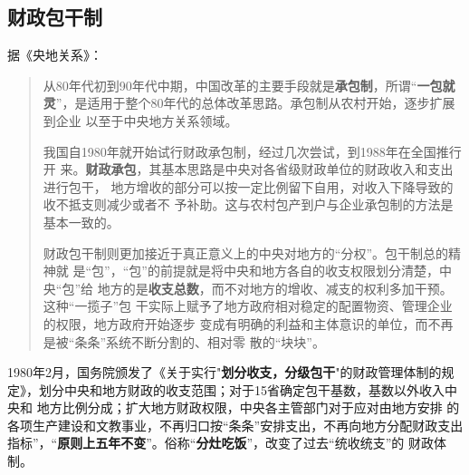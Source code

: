 \subsection{财政包干制}

据《央地关系》：
\begin{quotation}
  从80年代初到90年代中期，中国改革的主要手段就是\textbf{承包制}，所谓“\textbf{一包就
    灵}”，是适用于整个80年代的总体改革思路。承包制从农村开始，逐步扩展到企业
  以至于中央地方关系领域。

  我国自1980年就开始试行财政承包制，经过几次尝试，到1988年在全国推行开
  来。\textbf{财政承包}，其基本思路是中央对各省级财政单位的财政收入和支出进行包干，
  地方增收的部分可以按一定比例留下自用，对收入下降导致的收不抵支则减少或者不
  予补助。这与农村包产到户与企业承包制的方法是基本一致的。

  财政包干制则更加接近于真正意义上的中央对地方的“分权”。包干制总的精神就
  是“包”，“包”的前提就是将中央和地方各自的收支权限划分清楚，中央“包”给
  地方的是\textbf{收支总数}，而不对地方的增收、减支的权利多加干预。这种“一揽子”包
  干实际上赋予了地方政府相对稳定的配置物资、管理企业的权限，地方政府开始逐步
  变成有明确的利益和主体意识的单位，而不再是被“条条”系统不断分割的、相对零
  散的“块块”。
\end{quotation}

1980年2月，国务院颁发了《关于实行"\textbf{划分收支，分级包干}"的财政管理体制的规
定》，划分中央和地方财政的收支范围；对于15省确定包干基数，基数以外收入中央和
地方比例分成；扩大地方财政权限，中央各主管部门对于应对由地方安排
的各项生产建设和文教事业，不再归口按“条条”安排支出，不再向地方分配财政支出
指标”，“\textbf{原则上五年不变}”。俗称“\textbf{分灶吃饭}”，改变了过去“统收统支”的
财政体制。

